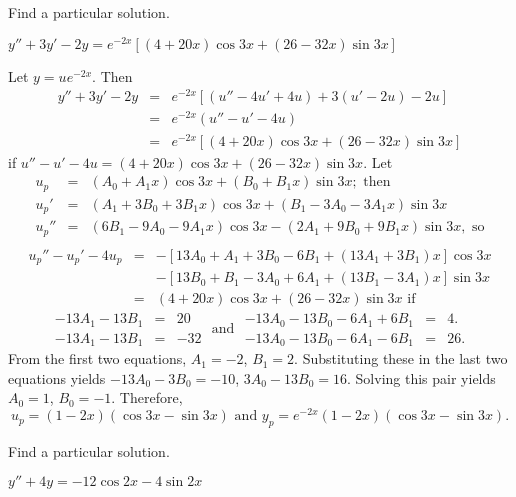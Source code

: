\documentclass{ximera}
\begin{document}
\begin{problem}\label{exer:5.5.6} Find a particular solution. 

$y''+3y'-2y=e^{-2x}\left[(4+20x)\cos 3x+(26-32x)\sin
3x\right]$

\begin{solution}
Let $y=ue^{-2x}$. Then
\begin{eqnarray*}
y''+3y'-2y&=&e^{-2x}\left[(u''-4u'+4u)+3(u'-2u)-2u\right]\\
&=&e^{-2x}(u''-u'-4u)\\ &=&
e^{-2x}\left[(4+20x)\cos 3x+(26-32x)\sin 3x\right]
\end{eqnarray*}
if $u''-u'-4u=(4+20x)\cos 3x+(26-32x)\sin 3x$.
Let
\begin{eqnarray*}
u_p&=&(A_0+A_1x)\cos3x+(B_0+B_1x)\sin3x; \text{ then}\\
u_p'&=&(A_1+3B_0+3B_1x)\cos3x+(B_1-3A_0-3A_1x)\sin3x\\
u_p''&=&(6B_1-9A_0-9A_1x)\cos3x-(2A_1+9B_0+9B_1x)\sin3x,\text{ so}\\
\end{eqnarray*}
\begin{eqnarray*}
u_p''-u_p'-4u_p&=&-\left[13A_0+A_1+3B_0-6B_1+(13A_1+3B_1)x\right]\cos3x
\\ &&-\left[13B_0+B_1-3A_0+6A_1+(13B_1-3A_1)x\right]\sin3x\\
&=&(4+20x)\cos 3x+(26-32x)\sin 3x \text{\ if}
\end{eqnarray*}
$$
\begin{array}{rcr}
-13A_1-13B_1&=&20\\ -13A_1-13B_1&=&-32
\end{array}
\text{ and }
\begin{array}{rcr}
-13A_0-13B_0-6A_1+6B_1&=&4.\\
-13A_0-13B_0-6A_1-6B_1&=&26.
\end{array}
$$
From the first two equations, $A_1=-2$, $B_1=2$. Substituting these in
the last two equations yields $-13A_0-3B_0=-10$, $3A_0-13B_0=16$.
Solving this pair yields $A_0=1$, $B_0=-1$. Therefore,
$$
 u_p=(1-2x)(\cos 3x-\sin 3x) \text{ and }
y_p=e^{-2x}(1-2x)(\cos 3x-\sin 3x).
$$
\end{solution}
\end{problem}

\begin{problem}\label{exer:5.5.7} Find a particular solution. 

$y''+4y=-12\cos2x-4\sin2x$
\end{problem}
\end{document}
